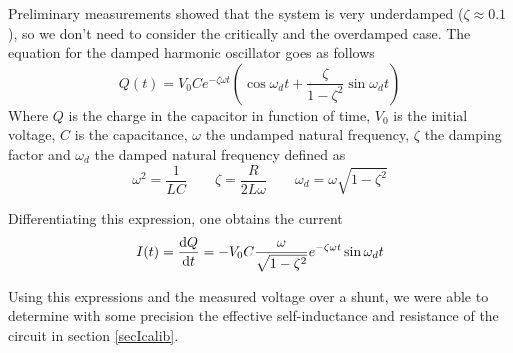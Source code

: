Preliminary measurements showed that the system is very underdamped ($\zeta 
\approx 0.1$), so we don't need to consider the critically and the 
overdamped case.  The equation for the damped harmonic oscillator goes as 
follows \cite{serway}
\begin{equation}
Q(t) = V_0 C e^{-\zeta \omega t} \left( \cos{\omega_d t} + \frac{\zeta} 
{1-\zeta^2} \sin{\omega_d t}\right)
\end{equation}
Where $Q$ is the charge in the capacitor in function of time, $V_0$ is the 
initial voltage, $C$ is the capacitance, $\omega$ the undamped natural 
frequency, $\zeta$ the damping factor and $\omega_d$ the damped natural 
frequency defined as
$$
\omega^2 = \frac{1}{LC} \qquad
\zeta = \frac{R}{2L \omega} \qquad
\omega_d = \omega \sqrt{1-\zeta^2}
$$

Differentiating this expression, one obtains the current
\begin{equation}
\label{current}
I(t) = \frac{\mathrm d Q}{\mathrm d t} = -V_0 C \frac{\omega}{\sqrt{1-\zeta^2}} e^{-\zeta \omega 
t} \sin{\omega_d t}
\end{equation}

Using this expressions and the measured voltage over a shunt, we were able to 
determine with some precision the effective self-inductance and resistance 
of the circuit in section \ref{secIcalib}.
